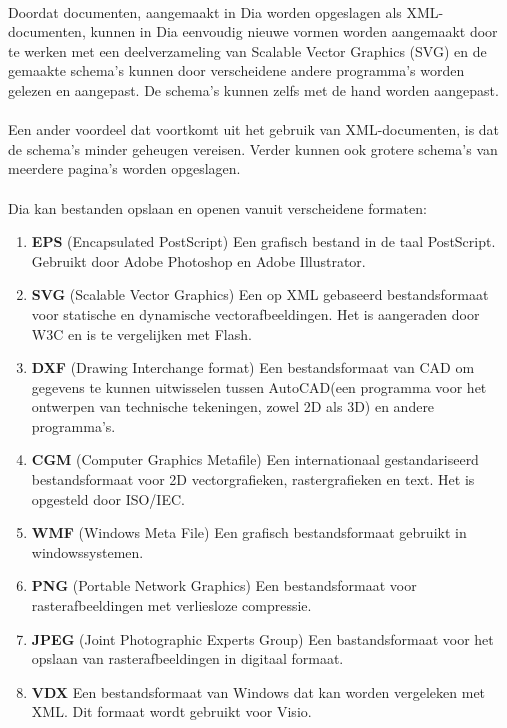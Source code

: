 \documentclass[12pt,a4paper]{report}
\begin{document}
\begin{flushleft}
\paragraph*{}
Doordat documenten, aangemaakt in Dia worden opgeslagen als XML-documenten, kunnen in Dia eenvoudig nieuwe vormen worden aangemaakt door te werken met een deelverzameling van Scalable Vector Graphics (SVG) en de gemaakte schema's kunnen door verscheidene andere programma's worden gelezen en aangepast. De schema's kunnen zelfs met de hand worden aangepast.
\paragraph*{}
Een ander voordeel dat voortkomt uit het gebruik van XML-documenten, is dat de schema's minder geheugen vereisen. Verder kunnen ook grotere schema's van meerdere pagina's worden opgeslagen.
\paragraph*{}
Dia kan bestanden opslaan en openen vanuit verscheidene formaten:
\begin{enumerate}
\item \textbf{EPS} (Encapsulated PostScript) Een grafisch bestand in de taal PostScript. Gebruikt door Adobe Photoshop en Adobe Illustrator.
\item \textbf{SVG} (Scalable Vector Graphics) Een op XML gebaseerd bestandsformaat voor statische en dynamische vectorafbeeldingen. Het is aangeraden door W3C en is te vergelijken met Flash.
\item \textbf{DXF} (Drawing Interchange format) Een bestandsformaat van CAD om gegevens te kunnen uitwisselen tussen AutoCAD(een programma voor het ontwerpen van technische tekeningen, zowel 2D als 3D) en andere programma's.
\item \textbf{CGM} (Computer Graphics Metafile) Een internationaal gestandariseerd bestandsformaat voor 2D vectorgrafieken, rastergrafieken en text. Het is opgesteld door ISO/IEC.
\item \textbf{WMF} (Windows Meta File) Een grafisch bestandsformaat gebruikt in windowssystemen.
\item \textbf{PNG} (Portable Network Graphics) Een bestandsformaat voor rasterafbeeldingen met verliesloze compressie. 
\item \textbf{JPEG} (Joint Photographic Experts Group) Een bastandsformaat voor het opslaan van rasterafbeeldingen in digitaal formaat.
\item \textbf{VDX} Een bestandsformaat van Windows dat kan worden vergeleken met XML. Dit formaat wordt gebruikt voor Visio.
\end{enumerate}



\end{flushleft}
\end{document}
